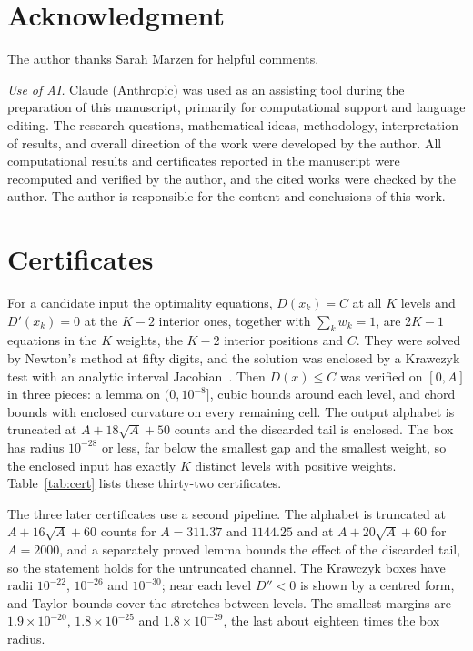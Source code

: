 \documentclass[journal]{IEEEtran}
\begin{document}
\section*{Acknowledgment}
The author thanks Sarah Marzen for helpful comments.

\emph{Use of AI.} Claude (Anthropic) was used as an assisting tool during the preparation of this manuscript, primarily for
computational support and language editing. The research questions, mathematical ideas, methodology, interpretation of results, and
overall direction of the work were developed by the author. All computational results and certificates reported in the manuscript
were recomputed and verified by the author, and the cited works were checked by the author. The author is responsible for the content
and conclusions of this work.

\appendices
\section{Certificates}\label{app:cert}
For a candidate input the optimality equations, $D(x_k) = C$ at all $K$ levels and $D'(x_k) = 0$ at the $K - 2$ interior ones, together
with $\sum_k w_k = 1$, are $2K - 1$ equations in the $K$ weights, the $K - 2$ interior positions and $C$. They were solved by Newton's
method at fifty digits, and the solution was enclosed by a Krawczyk test with an analytic interval Jacobian~\cite{Krawczyk1969}.
Then $D(x) \le C$ was verified on $[0, A]$ in three pieces: a lemma on $(0, 10^{-8}]$, cubic bounds around each level, and chord bounds with
enclosed curvature on every remaining cell. The output alphabet is truncated at $A + 18\sqrt A + 50$ counts and the discarded tail is
enclosed. The box has radius $10^{-28}$ or less, far below the smallest gap and the smallest weight, so the enclosed input has exactly $K$
distinct levels with positive weights. Table~\ref{tab:cert} lists these thirty-two certificates.

The three later certificates use a second pipeline. The alphabet is truncated at $A + 16\sqrt A + 60$ counts for $A =
311.37$ and $1144.25$ and at $A + 20\sqrt A + 60$ for $A = 2000$, and a separately proved lemma bounds the effect of the discarded tail,
so the statement holds for the untruncated channel. The Krawczyk boxes have radii $10^{-22}$, $10^{-26}$ and $10^{-30}$; near each
level $D'' < 0$ is shown by a centred form, and Taylor bounds cover the stretches between levels. The smallest margins are
$1.9\times 10^{-20}$, $1.8\times 10^{-25}$ and $1.8\times 10^{-29}$, the last about eighteen times the box radius.
\end{document}
